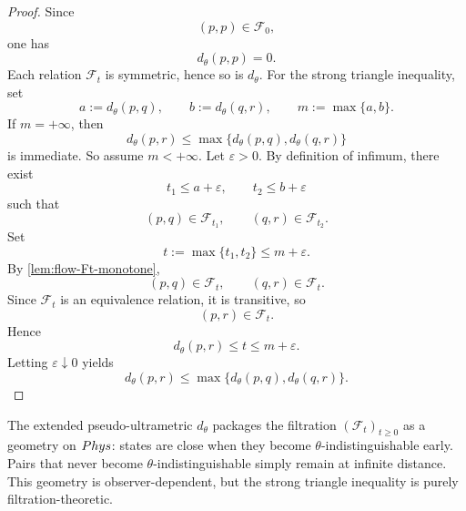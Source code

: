 \begin{proof}
	Since
	\[
		(p,p)\in \mathcal F_0,
	\]
	one has
	\[
		d_\theta(p,p)=0.
	\]
	Each relation \(\mathcal F_t\) is symmetric, hence so is \(d_\theta\).
	For the strong triangle inequality, set
	\[
		a:=d_\theta(p,q),
		\qquad
		b:=d_\theta(q,r),
		\qquad
		m:=\max\{a,b\}.
	\]
	If \(m=+\infty\), then
	\[
		d_\theta(p,r)\le \max\{d_\theta(p,q),d_\theta(q,r)\}
	\]
	is immediate. So assume \(m<+\infty\).
	Let \(\varepsilon>0\). By definition of infimum, there exist
	\[
		t_1\le a+\varepsilon,
		\qquad
		t_2\le b+\varepsilon
	\]
	such that
	\[
		(p,q)\in \mathcal F_{t_1},
		\qquad
		(q,r)\in \mathcal F_{t_2}.
	\]
	Set
	\[
		t:=\max\{t_1,t_2\}\le m+\varepsilon.
	\]
	By \cref{lem:flow-Ft-monotone},
	\[
		(p,q)\in \mathcal F_t,
		\qquad
		(q,r)\in \mathcal F_t.
	\]
	Since \(\mathcal F_t\) is an equivalence relation, it is transitive, so
	\[
		(p,r)\in \mathcal F_t.
	\]
	Hence
	\[
		d_\theta(p,r)\le t\le m+\varepsilon.
	\]
	Letting \(\varepsilon\downarrow0\) yields
	\[
		d_\theta(p,r)\le \max\{d_\theta(p,q),d_\theta(q,r)\}.
	\]
\end{proof}
\begin{remark}
	The extended pseudo-ultrametric \(d_\theta\) packages the filtration
	\((\mathcal F_t)_{t\ge0}\) as a geometry on \(Phys\):
	states are close when they become \(\theta\)-indistinguishable early.
	Pairs that never become \(\theta\)-indistinguishable simply remain at
	infinite distance. This geometry is observer-dependent, but the strong
	triangle inequality is purely filtration-theoretic.
\end{remark}
